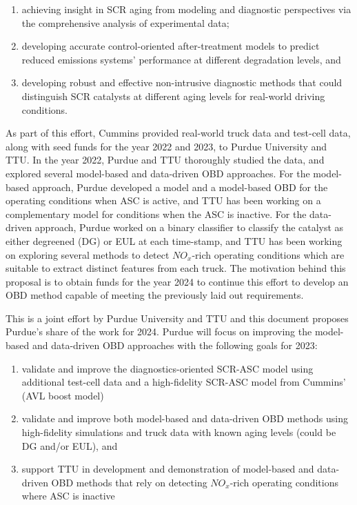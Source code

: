 \begin{enumerate}
\item achieving insight in SCR aging from modeling and diagnostic perspectives
via the comprehensive analysis of experimental data;
\item developing accurate control-oriented after-treatment models to predict
reduced emissions systems' performance at different degradation levels, and
\item developing robust and effective non-intrusive diagnostic methods that could distinguish SCR catalysts at different aging levels for real-world driving conditions.
\end{enumerate}

As part of this effort, Cummins provided real-world truck data and test-cell
data, along with seed funds for the year 2022 and 2023, to Purdue University
and TTU. In the year 2022, Purdue and TTU thoroughly studied the data, and
explored several model-based and data-driven OBD approaches. For the
model-based approach, Purdue developed a model and a model-based OBD for the
operating conditions when ASC is active, and TTU has been working on a
complementary model for conditions when the ASC is inactive. For the
data-driven approach, Purdue worked on a binary classifier to classify the
catalyst as either degreened (DG) or EUL at each time-stamp, and TTU has been
working on exploring several methods to detect $NO_x$-rich operating conditions
which are suitable to extract distinct features from each truck. The motivation
behind this proposal is to obtain funds for the year 2024 to continue this
effort to develop an OBD method capable of meeting the previously laid out
requirements.

This is a joint effort by Purdue University and TTU and this document proposes
Purdue's share of the work for 2024. Purdue will focus on improving the
model-based and data-driven OBD approaches with the following goals for 2023:
\begin{enumerate}
\item validate and improve the diagnostics-oriented SCR-ASC model using
additional test-cell data and a high-fidelity SCR-ASC model from Cummins' (AVL
boost model)
\item validate and improve both model-based and data-driven OBD methods using
high-fidelity simulations and truck data with known aging levels (could be DG
and/or EUL), and
\item  support TTU in development and demonstration of model-based and data-driven OBD methods that rely on detecting $NO_x$-rich operating conditions where ASC is inactive
\end{enumerate}

